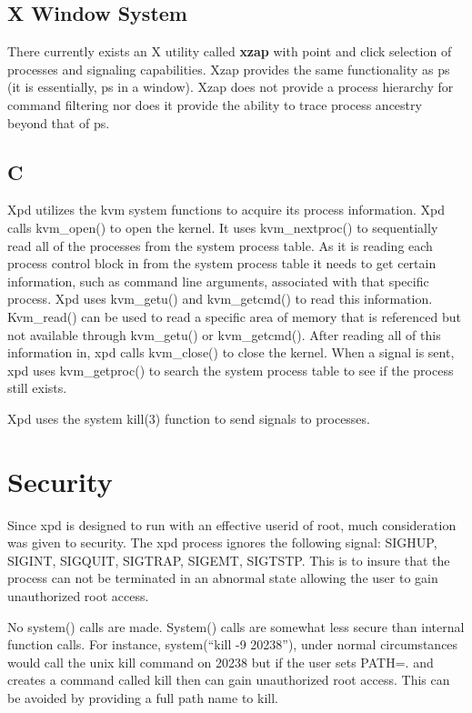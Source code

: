 \section{X Window System}
There currently exists an X utility called {\bf xzap} with point and click selection of processes and signaling capabilities.
Xzap provides the same functionality as ps (it is essentially, ps in a window).
Xzap does not provide a process hierarchy for command filtering nor does it provide the ability to trace process ancestry beyond that of ps.


\section{C}
Xpd utilizes the kvm system functions to acquire its process information.
Xpd calls kvm\_open() to open the kernel.
It uses kvm\_nextproc() to sequentially read all of the processes from the system process table.
As it is reading each process control block in from the system process table it needs to get certain information, such as command line arguments, associated with that specific process.
Xpd uses kvm\_getu() and kvm\_getcmd() to read this information.
Kvm\_read() can be used to read a specific area of memory that is referenced but not available through kvm\_getu() or kvm\_getcmd().
After reading all of this information in, xpd calls kvm\_close() to close the kernel.
When a signal is sent, xpd uses kvm\_getproc() to search the system process table to see if the process still exists.

Xpd uses the system kill(3) function to send signals to processes.



\chapter{Security}
Since xpd is designed to run with an effective userid of root, much consideration was given to security.
The xpd process ignores the following signal: SIGHUP, SIGINT, SIGQUIT, SIGTRAP, SIGEMT, SIGTSTP.
This is to insure that the process can not be terminated in an abnormal state allowing the user to gain unauthorized root access.

No system() calls are made.
System() calls are somewhat less secure than internal function calls.
For instance, system(``kill -9 20238''), under normal circumstances would call the unix kill command on 20238 but if the user sets PATH=. and creates a command called kill then can gain unauthorized root access.
This can be avoided by providing a full path name to kill.

